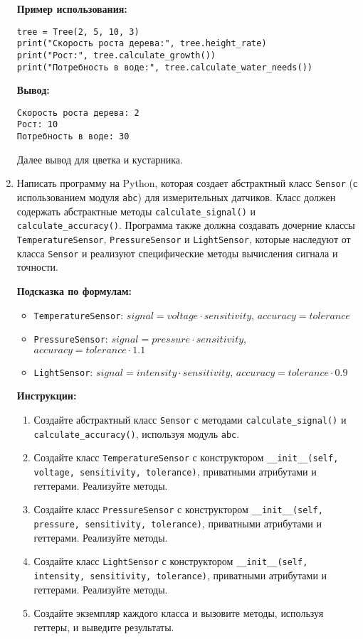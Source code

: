 \begin{enumerate}
\textbf{Пример использования:}
\begin{verbatim}
tree = Tree(2, 5, 10, 3)
print("Скорость роста дерева:", tree.height_rate)
print("Рост:", tree.calculate_growth())
print("Потребность в воде:", tree.calculate_water_needs())
\end{verbatim}

\textbf{Вывод:}
\begin{verbatim}
Скорость роста дерева: 2
Рост: 10
Потребность в воде: 30
\end{verbatim}

Далее вывод для цветка и кустарника.

\item
Написать программу на Python, которая создает абстрактный класс \texttt{Sensor} (с использованием модуля \texttt{abc}) для измерительных датчиков. 
Класс должен содержать абстрактные методы \texttt{calculate\_signal()} и \texttt{calculate\_accuracy()}. 
Программа также должна создавать дочерние классы \texttt{TemperatureSensor}, \texttt{PressureSensor} и \texttt{LightSensor}, 
которые наследуют от класса \texttt{Sensor} и реализуют специфические методы вычисления сигнала и точности.

\textbf{Подсказка по формулам:}
\begin{itemize}
    \item \texttt{TemperatureSensor}: $signal = voltage \cdot sensitivity$, $accuracy = tolerance$
    \item \texttt{PressureSensor}: $signal = pressure \cdot sensitivity$, $accuracy = tolerance \cdot 1.1$
    \item \texttt{LightSensor}: $signal = intensity \cdot sensitivity$, $accuracy = tolerance \cdot 0.9$
\end{itemize}

\textbf{Инструкции:}
\begin{enumerate}
    \item Создайте абстрактный класс \texttt{Sensor} с методами \texttt{calculate\_signal()} и \texttt{calculate\_accuracy()}, используя модуль \texttt{abc}.
    \item Создайте класс \texttt{TemperatureSensor} с конструктором \texttt{\_\_init\_\_(self, voltage, sensitivity, tolerance)}, приватными атрибутами и геттерами. Реализуйте методы.
    \item Создайте класс \texttt{PressureSensor} с конструктором \texttt{\_\_init\_\_(self, pressure, sensitivity, tolerance)}, приватными атрибутами и геттерами. Реализуйте методы.
    \item Создайте класс \texttt{LightSensor} с конструктором \texttt{\_\_init\_\_(self, intensity, sensitivity, tolerance)}, приватными атрибутами и геттерами. Реализуйте методы.
    \item Создайте экземпляр каждого класса и вызовите методы, используя геттеры, и выведите результаты.
\end{enumerate}


\end{enumerate}
